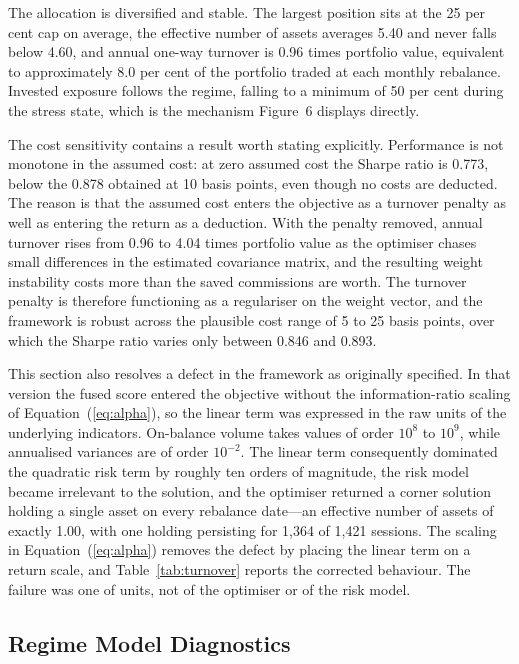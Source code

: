 The allocation is diversified and stable. The largest position sits at the 25 per cent
cap on average, the effective number of assets averages 5.40 and never falls below
4.60, and annual one-way turnover is 0.96 times portfolio value, equivalent to
approximately 8.0 per cent of the portfolio traded at each monthly rebalance. Invested
exposure follows the regime, falling to a minimum of 50 per cent during the stress
state, which is the mechanism Figure~6 displays directly.

The cost sensitivity contains a result worth stating explicitly. Performance is not
monotone in the assumed cost: at zero assumed cost the Sharpe ratio is 0.773, below the
0.878 obtained at 10 basis points, even though no costs are deducted. The reason is
that the assumed cost enters the objective as a turnover penalty as well as entering
the return as a deduction. With the penalty removed, annual turnover rises from
0.96 to 4.04 times portfolio value as the optimiser chases small differences in the
estimated covariance matrix, and the resulting weight instability costs more than the
saved commissions are worth. The turnover penalty is therefore functioning as a
regulariser on the weight vector, and the framework is robust across the plausible cost
range of 5 to 25 basis points, over which the Sharpe ratio varies only between 0.846
and 0.893.

This section also resolves a defect in the framework as originally specified. In that
version the fused score entered the objective without the information-ratio scaling of
Equation~(\ref{eq:alpha}), so the linear term was expressed in the raw units of the
underlying indicators. On-balance volume takes values of order $10^{8}$ to $10^{9}$,
while annualised variances are of order $10^{-2}$. The linear term consequently
dominated the quadratic risk term by roughly ten orders of magnitude, the risk model
became irrelevant to the solution, and the optimiser returned a corner solution holding
a single asset on every rebalance date---an effective number of assets of exactly 1.00,
with one holding persisting for 1{,}364 of 1{,}421 sessions. The scaling in
Equation~(\ref{eq:alpha}) removes the defect by placing the linear term on a return
scale, and Table~\ref{tab:turnover} reports the corrected behaviour. The failure was one of units, not
of the optimiser or of the risk model.

\subsection{Regime Model Diagnostics}
\label{sec:regimefit}

